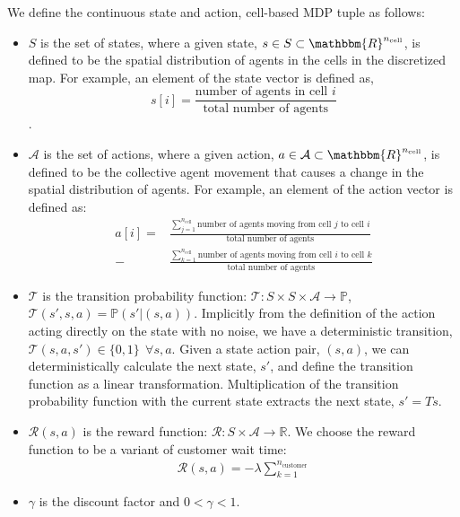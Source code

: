 \documentclass[journal]{IEEEtran}
\begin{document}
\newpage
We define the continuous state and action, cell-based MDP tuple as follows: 
\begin{itemize}
\item $S$ is the set of states, where a given state, $s \in S \subset \mathbbm{R}^{n_\text{cell}}$, is defined to be the spatial distribution of agents in the cells in the discretized map. For example, an element of the state vector is defined as, 
    $$s[i] = \frac{\text{number of agents in cell }i}{\text{total number of agents}}$$.

\item $\mathcal{A}$ is the set of actions, where a given action, $a \in \mathcal{A} \subset \mathbbm{R}^{n_\text{cell}}$, is defined to be the collective agent movement that causes a change in the spatial distribution of agents. For example, an element of the action vector is defined as: 
    \begin{align*}
    a[i] = &\frac{
    \sum_{j=1}^{n_\text{cell}} \text{number of agents moving from cell }j\text{ to cell }i}{\text{total 		number of agents}} \\ 
    - &\frac{
    \sum_{k=1}^{n_\text{cell}} \text{number of agents moving from cell }i\text{ to cell }k}
    {\text{total number of agents}}
    \end{align*}

\item $\mathcal{T}$ is the transition probability function: $\mathcal{T}:S \times S \times \mathcal{A}\rightarrow \mathbb{P}$, $\mathcal{T}(s',s,a) = \mathbb{P}(s'|(s,a))$. Implicitly from the definition of the action acting directly on the state with no noise, we have a deterministic transition, $\mathcal{T}(s,a,s') \in \{0,1\} \ \ \forall s,a$. Given a state action pair, $(s,a)$, we can deterministically calculate the next state, $s'$, and define the transition function as a linear transformation. Multiplication of the transition probability function with the current state extracts the next state, $s' = T s$. 
    
\item $\mathcal{R}(s,a)$ is the reward function: $\mathcal{R}:S \times \mathcal{A} \rightarrow \mathbb{R}$. We choose the reward function to be a variant of customer wait time: 
    \begin{align*}
    	\mathcal{R}(s,a) = -\lambda \sum_{k=1}^{n_\text{customer}} 
    \end{align*}
    \item $\gamma$ is the discount factor and $0 < \gamma < 1$.
\end{itemize}
\end{document}
